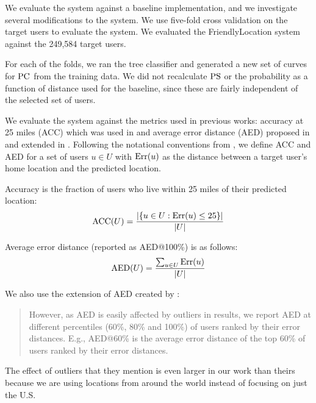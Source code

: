 \label{chap:eval}

We evaluate the system against a baseline implementation, and we investigate
several modifications to the system.
%
We use five-fold cross validation on the target users to evaluate the system.
We evaluated the FriendlyLocation system against the 249,584 target users.

For each of the folds, we ran the tree classifier and generated a new set of
curves for $\operatorname{PC}$ from the training data.
%
We did not recalculate $\operatorname{PS}$ or the probability as a function of distance
used for the baseline, since these are fairly independent of the selected set
of users.

We evaluate the system against the metrics used in previous works:
accuracy at 25 miles (ACC) which was used in \cite{backstrom2010find}
and average error distance (AED) proposed in \cite{cheng2010you} and
extended in \cite{li2012towards}.
%
Following the notational conventions from \cite{li2012towards}, we define ACC
and AED for a set of users $u \in U$ with $\operatorname{Err}(u)$ as the distance between a
target user's home location and the predicted location.

Accuracy is the fraction of users who live within 25 miles of their predicted
location:
\[
    \operatorname{ACC}(U) = { |\{ u \in U : \operatorname{Err}(u)\le25 \}| \over |U| }
\]

Average error distance (reported as AED@100\%) is as follows:
\[
    \operatorname{AED}(U) = { \sum_{u \in U} \operatorname{Err}(u) \over |U| }
\]

We also use the extension of AED created by \cite{li2012towards}:
\begin{quote}
However, as AED is easily affected by outliers in results, we report AED at
different percentiles (60\%, 80\% and 100\%) of users ranked by their error
distances. E.g., AED@60\% is the average error distance of the top 60\% of
users ranked by their error distances.
\end{quote}
The effect of outliers that they mention is even larger in our work than theirs
because we are using locations from around the world instead of focusing on
just the U.S.

